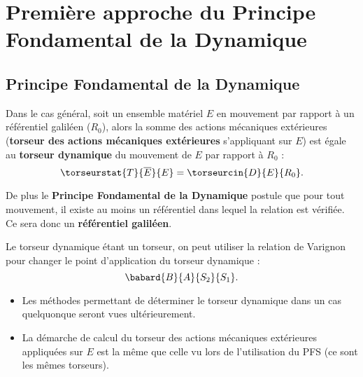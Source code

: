 \section[Première approche du PFD]{Première approche du Principe Fondamental de la Dynamique}

\subsection{Principe Fondamental de la Dynamique}



\begin{defi}
Dans le cas général, soit un ensemble matériel $E$ en mouvement par rapport à un référentiel galiléen ($R_0$), alors la somme des actions mécaniques extérieures (\textbf{torseur des actions mécaniques extérieures} s'appliquant sur $E$) est égale au \textbf{torseur dynamique} du mouvement de $E$ par rapport à $R_0$ :
$$
\torseurstat{T}{\overline{E}}{E}=\torseurcin{D}{E}{R_0}.
$$

De plus le \textbf{Principe Fondamental de la Dynamique} postule que pour tout mouvement, il existe au moins un référentiel dans lequel la relation est vérifiée. Ce sera donc un \textbf{référentiel galiléen}.
\end{defi}


\begin{resultat}
Le torseur dynamique étant un torseur, on peut utiliser la relation de Varignon pour changer le point d'application du torseur dynamique :
$$
\babard{B}{A}{S_2}{S_1}.
$$
\end{resultat}

\begin{remarque}[s]
\begin{itemize}
\item Les méthodes permettant de déterminer le torseur dynamique dans un cas quelquonque seront vues ultérieurement.
\item La démarche de calcul du torseur des actions mécaniques extérieures appliquées sur $E$ est la même que celle vu lors de l'utilisation du PFS (ce sont les mêmes torseurs). 
\end{itemize}
\end{remarque}

